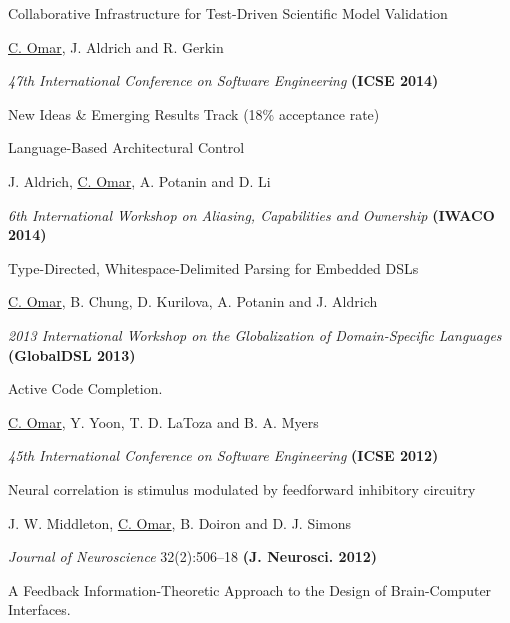 \documentclass[10pt,letterpaper]{article}
\renewenvironment{itemize}{
  \begin{list}{}{
    \setlength{\leftmargin}{1.25em}
    \setlength{\itemsep}{0.25em}
    \setlength{\parskip}{0pt}
    \setlength{\parsep}{0.2em}
  }
}{
  \end{list}
}
\begin{document}
\begin{enumerate}
  \item Collaborative Infrastructure for Test-Driven Scientific Model Validation
        \begin{itemize}
          \item \underline{C. Omar}, J. Aldrich and R. Gerkin
          \item \textit{47th International Conference on Software Engineering} {\textbf{(ICSE 2014)}}
          \item New Ideas \& Emerging Results Track (18\% acceptance rate)
        \end{itemize}
  \item Language-Based Architectural Control
        \begin{itemize}
          \item J. Aldrich, \underline{C. Omar}, A. Potanin and D. Li
          \item \textit{6th International Workshop on Aliasing, Capabilities and Ownership} {\textbf{(IWACO 2014)}}
        \end{itemize}
  \item Type-Directed, Whitespace-Delimited Parsing for Embedded DSLs
        \begin{itemize}
          \item \underline{C. Omar}, B. Chung, D. Kurilova, A. Potanin and J. Aldrich
          \item \textit{2013 International Workshop on the Globalization of Domain-Specific Languages} {\textbf{(GlobalDSL 2013)}}
        \end{itemize}
  \item {Active Code Completion}.
        \begin{itemize}
          \item \underline{C. Omar}, Y. Yoon, T. D. LaToza and B. A. Myers
          \item \textit{45th International Conference on Software Engineering} {\textbf{(ICSE 2012)}}
        \end{itemize}
  \item {Neural correlation is stimulus modulated by feedforward inhibitory circuitry}
        \begin{itemize}
          \item J. W. Middleton, \underline{C. Omar}, B. Doiron and D. J. Simons
          \item \textit{Journal of Neuroscience} 32(2):506--18 {\textbf{(J. Neurosci. 2012)}}
        \end{itemize}
  \item A Feedback Information-Theoretic Approach to the Design of Brain-Computer Interfaces.

\end{enumerate}
\end{document}
